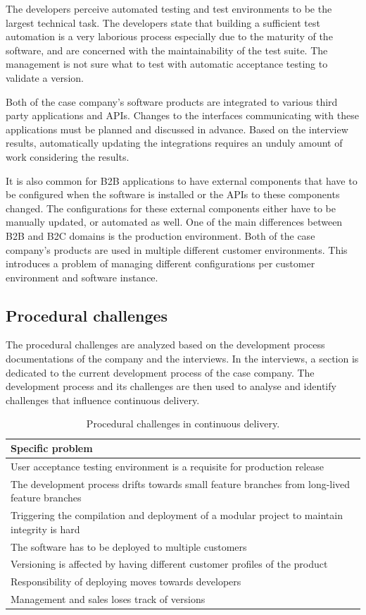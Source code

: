 \documentclass[lnbip]{svmultln}
\begin{document}
The developers perceive automated testing and test environments to be the largest technical task. The developers state that building a sufficient test automation is a very laborious process especially due to the maturity of the software, and are concerned with the maintainability of the test suite. The management is not sure what to test with automatic acceptance testing to validate a version. 

Both of the case company's software products are integrated to various third party applications and APIs. Changes to the interfaces communicating with these applications must be planned and discussed in advance. Based on the interview results, automatically updating the integrations requires an unduly amount of work considering the results. 

It is also common for B2B applications to have external components that have to be configured when the software is installed or the APIs to these components changed. The configurations for these external components either have to be manually updated, or automated as well. One of the main differences between B2B and B2C domains is the production environment. Both of the case company's products are used in multiple different customer environments. This introduces a problem of managing different configurations per customer environment and software instance.

\subsection{Procedural challenges}
The procedural challenges are analyzed based on the development process documentations of the company and the interviews. In the interviews, a section is dedicated to the current development process of the case company. The development process and its challenges are then used to analyse and identify challenges that influence continuous delivery.

\begin{table}[htb]
    \begin{tabular}{ | p{12cm} |}
    \hline
    \textbf{Specific problem} \\ \hline
    User acceptance testing environment is a requisite for production release \\ \hline
    The development process drifts towards small feature branches from long-lived feature branches \\ \hline
  Triggering the compilation and deployment of a modular project to maintain integrity is hard \\ \hline
  The software has to be deployed to multiple customers \\ \hline
  Versioning is affected by having different customer profiles of the product \\ \hline
  Responsibility of deploying moves towards developers \\ \hline
  Management and sales loses track of versions \\
    \hline
    \end{tabular}
    \caption{Procedural challenges in continuous delivery.}
    \end{table}
\end{document}
